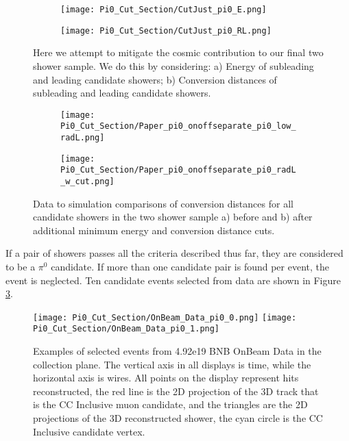 \begin{figure}[H]
\centering
  \begin{subfigure}[t]{0.4\textwidth}
    \centering
\texttt{[image: Pi0\_Cut\_Section/CutJust\_pi0\_E.png]}
  \caption{ }
  \end{subfigure} 
  \hspace{20mm}
  \begin{subfigure}[t]{0.4\textwidth}
    \centering
\texttt{[image: Pi0\_Cut\_Section/CutJust\_pi0\_RL.png]}
  \caption{ }
  \end{subfigure} 
\caption{ Here we attempt to mitigate the cosmic contribution to our final two shower sample. We do this by considering: a) Energy of subleading and leading candidate showers; b) Conversion distances of subleading and leading candidate showers. }
\label{fig:cutjust_pi0_e}
\end{figure}

\begin{figure}[H]
\centering
  \begin{subfigure}[t]{0.4\textwidth}
    \centering
\texttt{[image: Pi0\_Cut\_Section/Paper\_pi0\_onoffseparate\_pi0\_low\_radL.png]}
  \caption{ }
  \end{subfigure} 
  \hspace{20mm}
  \begin{subfigure}[t]{0.4\textwidth}
    \centering
\texttt{[image: Pi0\_Cut\_Section/Paper\_pi0\_onoffseparate\_pi0\_radL\_w\_cut.png]}
  \caption{ }
  \end{subfigure} 
\caption{ Data to simulation comparisons of conversion distances for all candidate showers in the two shower sample a) before and b) after additional minimum energy and conversion distance cuts. }
\label{fig:physics_radl_before_after}
\end{figure}

\par If a pair of showers passes all the criteria described thus far, they are considered to be a $\pi^0$ candidate. If more than one candidate pair is found per event, the event is neglected.  Ten candidate events selected from data are shown in Figure \ref{fig:physics_pi0_onbeam_eventdisplays}.
\begin{figure}[h!]
\centering
\texttt{[image: Pi0\_Cut\_Section/OnBeam\_Data\_pi0\_0.png]}
\texttt{[image: Pi0\_Cut\_Section/OnBeam\_Data\_pi0\_1.png]}
\caption{ Examples of selected events from 4.92e19 BNB OnBeam Data in the collection plane. The vertical axis in all displays is time, while the horizontal axis is wires. All points on the display represent hits reconstructed, the red line is the 2D projection of the 3D track that is the CC Inclusive muon candidate, and the triangles are the 2D projections of the 3D reconstructed shower, the cyan circle is the CC Inclusive candidate vertex. }
\label{fig:physics_pi0_onbeam_eventdisplays}
\end{figure}

